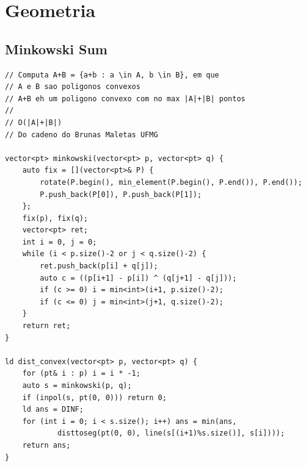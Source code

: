 \documentclass[11pt, a4paper, twoside]{article}
\begin{document}


\twocolumn

\tableofcontents


%
%

\section{Geometria}

\subsection{Minkowski Sum}
\begin{verbatim}
// Computa A+B = {a+b : a \in A, b \in B}, em que
// A e B sao poligonos convexos
// A+B eh um poligono convexo com no max |A|+|B| pontos
//
// O(|A|+|B|)
// Do cadeno do Brunas Maletas UFMG

vector<pt> minkowski(vector<pt> p, vector<pt> q) {
	auto fix = [](vector<pt>& P) {
		rotate(P.begin(), min_element(P.begin(), P.end()), P.end());
		P.push_back(P[0]), P.push_back(P[1]);
	};
	fix(p), fix(q);
	vector<pt> ret;
	int i = 0, j = 0;
	while (i < p.size()-2 or j < q.size()-2) {
		ret.push_back(p[i] + q[j]);
		auto c = ((p[i+1] - p[i]) ^ (q[j+1] - q[j]));
		if (c >= 0) i = min<int>(i+1, p.size()-2);
		if (c <= 0) j = min<int>(j+1, q.size()-2);
	}
	return ret;
}

ld dist_convex(vector<pt> p, vector<pt> q) {
	for (pt& i : p) i = i * -1;
	auto s = minkowski(p, q);
	if (inpol(s, pt(0, 0))) return 0;
	ld ans = DINF;
	for (int i = 0; i < s.size(); i++) ans = min(ans,
			disttoseg(pt(0, 0), line(s[(i+1)%s.size()], s[i])));
	return ans;
}
\end{verbatim}
\end{document}
